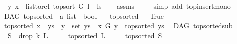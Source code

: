 \begin{isabellebody}
\ \ \ {\isachardoublequoteopen}{\isacharparenleft}{\kern0pt}y{\isacharcomma}{\kern0pt}\ x{\isacharparenright}{\kern0pt}\ {\isasymin}\ list{\isacharunderscore}{\kern0pt}to{\isacharunderscore}{\kern0pt}rel\ {\isacharparenleft}{\kern0pt}top{\isacharunderscore}{\kern0pt}sort\ G\ {\isacharparenleft}{\kern0pt}l\ {\isacharhash}{\kern0pt}\ ls{\isacharparenright}{\kern0pt}{\isacharparenright}{\kern0pt}{\isachardoublequoteclose}\isanewline
%
\isadelimproof
\ \ %
\endisadelimproof
%
\isatagproof
{}\isamarkupfalse%
\ assms\ \isanewline
\ \ \isamarkupfalse%
\ {\isacharparenleft}{\kern0pt}simp\ add{\isacharcolon}{\kern0pt}\ top{\isacharunderscore}{\kern0pt}insert{\isacharunderscore}{\kern0pt}mono{\isacharparenright}{\kern0pt}%
\endisatagproof
{\isafoldproof}%
%
\isadelimproof
\ \isanewline
%
\endisadelimproof
\isanewline
\isanewline
\isanewline
{}\isamarkupfalse%
\ {\isacharparenleft}{\kern0pt}\ DAG{\isacharparenright}{\kern0pt}\ top{\isacharunderscore}{\kern0pt}sorted\ {\isacharcolon}{\kern0pt}{\isacharcolon}{\kern0pt}\ {\isachardoublequoteopen}{\isacharprime}{\kern0pt}a\ list\ {\isasymRightarrow}\ bool{\isachardoublequoteclose}\ \isanewline
\ \ {\isachardoublequoteopen}top{\isacharunderscore}{\kern0pt}sorted\ {\isacharbrackleft}{\kern0pt}{\isacharbrackright}{\kern0pt}\ {\isacharequal}{\kern0pt}\ True{\isachardoublequoteclose}\ {\isacharbar}{\kern0pt}\isanewline
\ \ {\isachardoublequoteopen}top{\isacharunderscore}{\kern0pt}sorted\ {\isacharparenleft}{\kern0pt}x\ {\isacharhash}{\kern0pt}\ ys{\isacharparenright}{\kern0pt}\ {\isacharequal}{\kern0pt}\ {\isacharparenleft}{\kern0pt}{\isacharparenleft}{\kern0pt}{\isasymforall}y\ {\isasymin}\ set\ ys{\isachardot}{\kern0pt}\ {\isasymnot}\ x\ {\isasymrightarrow}\isactrlsup {\isacharplus}{\kern0pt}\isactrlbsub G\isactrlesub \ y{\isacharparenright}{\kern0pt}\ {\isasymand}\ top{\isacharunderscore}{\kern0pt}sorted\ ys{\isacharparenright}{\kern0pt}{\isachardoublequoteclose}\isanewline
\isanewline
{}\isamarkupfalse%
\ {\isacharparenleft}{\kern0pt}\ DAG{\isacharparenright}{\kern0pt}\ top{\isacharunderscore}{\kern0pt}sorted{\isacharunderscore}{\kern0pt}sub{\isacharcolon}{\kern0pt}\isanewline
\ \ \ {\isachardoublequoteopen}S\ {\isacharequal}{\kern0pt}\ drop\ k\ L{\isachardoublequoteclose}\isanewline
\ \ \ \ \ {\isachardoublequoteopen}top{\isacharunderscore}{\kern0pt}sorted\ L{\isachardoublequoteclose}\ \ \isanewline
\ \ \ {\isachardoublequoteopen}top{\isacharunderscore}{\kern0pt}sorted\ S{\isachardoublequoteclose}\isanewline

\end{isabellebody}
